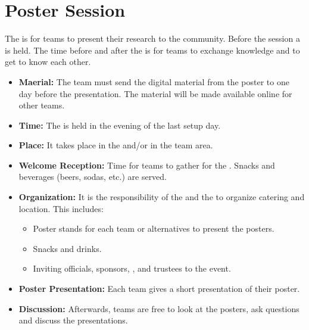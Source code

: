 \section{Poster Session}
\label{sec:setupdays:postersession}
The \PS{} is for teams to present their research to the \AtHome{} community. Before the session a \WelcomeReception{} is held. The time before and after the \PS{} is for teams to exchange knowledge and to get to know each other.
\begin{itemize}
	\item \textbf{Maerial:} The team must send the digital material from the poster to  one day before the presentation. The material will be made available online for other teams.
	\item \textbf{Time:} The \PS{} is held in the evening of the last setup day.
	\item \textbf{Place:} It takes place in the \Arena{} and/or in the team area.
	\item \textbf{Welcome Reception:} Time for teams to gather for the \PS{}. Snacks and beverages (beers, sodas, etc.) are served.
	\item \textbf{Organization:} It is the responsibility of the  and the  to organize catering and location. This includes:
		\begin{itemize}
			\item Poster stands for each team or alternatives to present the posters. 
			\item Snacks and drinks.
			\item Inviting officials, sponsors, , and \RCF{} trustees to the event.
		\end{itemize}
	\item \textbf{Poster Presentation:} Each team gives a short presentation of their poster.
	\item \textbf{Discussion:} Afterwards, teams are free to look at the posters, ask questions and discuss the presentations.
\end{itemize}

